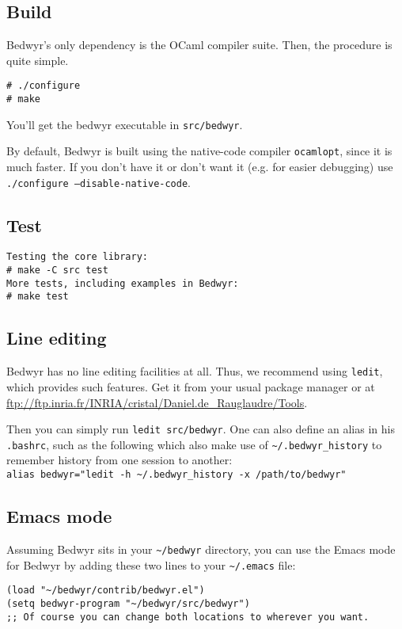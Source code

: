 \documentclass{article}
\begin{document}
\subsection{Build}

Bedwyr's only dependency is the OCaml compiler suite.
Then, the procedure is quite simple.

\begin{verbatim}
# ./configure
# make
\end{verbatim}

You'll get the bedwyr executable in \texttt{src/bedwyr}.

By default, Bedwyr is built using the native-code compiler \texttt{ocamlopt},
since it is much faster. If you don't have it or don't want it (e.g.
for easier debugging) use \texttt{./configure --disable-native-code}.

\subsection{Test}

\begin{verbatim}
Testing the core library:
# make -C src test
More tests, including examples in Bedwyr:
# make test
\end{verbatim}

\subsection{Line editing}

Bedwyr has no line editing facilities at all. Thus, we recommend using 
\texttt{ledit}, which provides such features.
Get it from your usual package manager or at
\url{ftp://ftp.inria.fr/INRIA/cristal/Daniel.de_Rauglaudre/Tools}.

Then you can simply run \texttt{ledit src/bedwyr}. One can also define
an alias in his \verb;.bashrc;, such as the following which also
make use of \verb#~/.bedwyr_history# to remember history from one session to 
another:\\
\verb|alias bedwyr="ledit -h ~/.bedwyr_history -x /path/to/bedwyr"|
 
\subsection{Emacs mode}

Assuming Bedwyr sits in your \verb.~/bedwyr. directory,
you can use the Emacs mode for Bedwyr by adding these two lines to your
\verb,~/.emacs, file:
\begin{verbatim}
(load "~/bedwyr/contrib/bedwyr.el")
(setq bedwyr-program "~/bedwyr/src/bedwyr")
;; Of course you can change both locations to wherever you want.
\end{verbatim}
\end{document}
